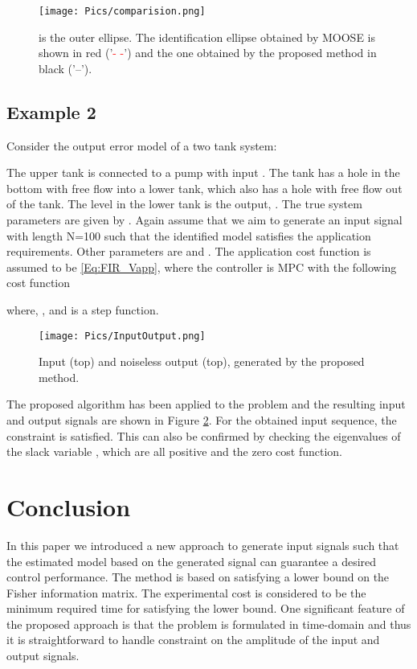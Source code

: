 \documentclass{ifacconf}
\begin{document}
\vspace{-0.1cm}
\begin{figure}[thpb]
      \centering
     \texttt{[image: Pics/comparision.png]}
      \caption{ is the outer ellipse. The identification ellipse obtained by MOOSE is shown in red ('\textcolor{red}{- -}') and the one obtained by the proposed method in black ('\textcolor{black}{--}').} 
      \label{Figure:Comparison}
\end{figure}
\vspace{-0.2cm}
\subsection{Example 2}
Consider the output error model of a two tank system:

The upper tank is connected to a pump with input . The tank has a hole in the bottom with free flow into a lower tank, which also has a hole with free flow out of the tank. The level in the lower tank is the output, . The true system parameters are given by . Again assume that we aim to generate an input signal with length N=100 such that the identified model satisfies the application requirements. Other parameters are 
 and
.
The application cost function is assumed to be \eqref{Eq:FIR_Vapp}, where the controller is MPC with the following cost function

where, ,  and  is a step function.
\begin{figure}[ht]
      \centering
     \texttt{[image: Pics/InputOutput.png]}
      \caption{Input (top) and noiseless output (top), generated by the proposed method.} 
      \label{Figure:IO}
\end{figure}
The proposed algorithm has been applied to the problem and the resulting input and output signals are shown in Figure \ref{Figure:IO}. For the obtained input sequence, the constraint  is satisfied.
This can also be confirmed by checking the eigenvalues of the slack variable , which are all positive and the zero cost function.
\section{Conclusion}
\label{sec:conclusion}
In this paper we introduced a new approach to generate input signals such that the estimated model based on the generated signal can guarantee a desired control performance. The method is based on satisfying a lower bound on the Fisher information matrix. The experimental cost is considered to be the minimum required time for satisfying the lower bound. One significant feature of the proposed approach is that the problem is formulated in time-domain and thus it is straightforward to handle constraint on the amplitude of the input and output signals. 
\end{document}
